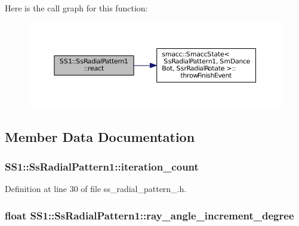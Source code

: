 Here is the call graph for this function\+:
\nopagebreak
\begin{figure}[H]
\begin{center}
\leavevmode
\includegraphics[width=350pt]{structSS1_1_1SsRadialPattern1_a1872fb5583afa69dbebc77afe11056fb_cgraph}
\end{center}
\end{figure}




\subsection{Member Data Documentation}
\subsubsection[{\texorpdfstring{iteration\+\_\+count}{iteration_count}}]{ S\+S1\+::\+Ss\+Radial\+Pattern1\+::iteration\+\_\+count}\hypertarget{structSS1_1_1SsRadialPattern1_a4ae4184d7ad98dfdc3b5c54506d5dd3e}{}\label{structSS1_1_1SsRadialPattern1_a4ae4184d7ad98dfdc3b5c54506d5dd3e}


Definition at line 30 of file ss\+\_\+radial\+\_\+pattern\+\_.\+h.

\subsubsection[{\texorpdfstring{ray\+\_\+angle\+\_\+increment\+\_\+degree}{ray_angle_increment_degree}}]{\setlength{\rightskip}{0pt plus 5cm}float S\+S1\+::\+Ss\+Radial\+Pattern1\+::ray\+\_\+angle\+\_\+increment\+\_\+degree}\hypertarget{structSS1_1_1SsRadialPattern1_a9649d929c434731e82c4d502c828dce2}{}\label{structSS1_1_1SsRadialPattern1_a9649d929c434731e82c4d502c828dce2}


